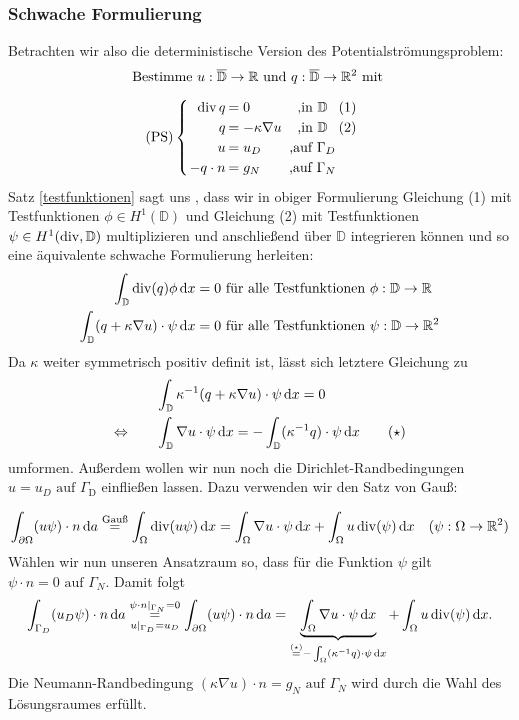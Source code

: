 \subsubsection{Schwache Formulierung}
Betrachten wir also die deterministische Version des Potentialströmungsproblem:
\[ \text{Bestimme } u:\overline{\mathbb{D}} \to \R \text{ und } q: \overline{\mathbb{D}} \to \R^2 \text{ mit } \newline \]
\[\setlength\arraycolsep{1pt}
\text{(PS)}\begin{cases} 
\begin{array}{rlcr}
\dive q     &= 0                 &\text{ ,} \text{in } \mathbb{D} &(1)\\
q           &= - \kappa \nabla u &\text{ ,} \text{in }\mathbb{D} &(2)\\
u           &= u_D               &\text{ ,} \text{auf } \Gamma_D \\
-q \cdot n  &= g_N               &\text{ ,} \text{auf } \Gamma_N 
\end{array}
\end{cases} 
\]
Satz \ref{testfunktionen} sagt uns , dass wir in obiger Formulierung Gleichung (1) mit Testfunktionen $\phi \in H^1(\mathbb{D})$ und Gleichung (2) mit Testfunktionen $\psi \in H^1(\operatorname{div},\mathbb{D})$ multiplizieren und anschließend über $\mathbb{D}$ integrieren können und so eine äquivalente schwache Formulierung herleiten:
\begin{align*}
	\int_{\mathbb{D}} \operatorname{div}(q) \phi \, \mathrm{d} x &= 0 \text{ für alle Testfunktionen } \phi : \mathbb{D} \to \mathbb{R} \\
	\int_{\mathbb{D}} (q + \kappa \nabla u) \cdot \psi \, \mathrm{d} x &= 0 \text{ für alle Testfunktionen } \psi : \mathbb{D} \to \mathbb{R}^2
\end{align*}
Da $\kappa$ weiter symmetrisch positiv definit ist, lässt sich letztere Gleichung zu 
\begin{align*}
	&\int_{\mathbb{D}} \kappa^{-1} (q + \kappa \nabla u) \cdot \psi \, \mathrm{d} x = 0 \\
	\Leftrightarrow \qquad &\int_{\mathbb{D}} \nabla u \cdot \psi \, \mathrm{d} x = - \int_{\mathbb{D}} (\kappa^{-1}q)\cdot \psi \, \mathrm{d} x \qquad (\star) 
\end{align*}
umformen. Außerdem wollen wir nun noch die Dirichlet-Randbedingungen $u = u_D \text{ auf } \Gamma_{\text{D}}$ einfließen lassen. Dazu verwenden wir den Satz von Gauß:


\[ \int_{\partial\Omega} (u\psi) \cdot n \, \mathrm{d} a \stackrel{\text{Gauß}}{=} 
 \int_{\Omega} \operatorname{div}(u\psi) \, \mathrm{d} x = \int_{\Omega} \nabla u \cdot \psi \, \mathrm{d} x + \int_{\Omega} u \operatorname{div}(\psi) \, \mathrm{d} x \quad (\psi:\Omega \to \mathbb{R}^2) \]
Wählen wir nun unseren Ansatzraum so, dass  für die Funktion $ \psi$ gilt $ \psi \cdot n = 0 \text{ auf } \Gamma_N $. Damit folgt
\begin{align*}
\int_{\Gamma_D} (u_D\psi) \cdot n \, \mathrm{d} a \overset{\psi \cdot n|_{\Gamma_N} = 0}{\underset{u |_{\Gamma_D} = u_D} {=}} \int_{\partial\Omega} (u\psi) \cdot n \, \mathrm{d} a = \underbrace{\int_{\Omega} \nabla u \cdot \psi \, \mathrm{d} x}_{\stackrel{(\star)}{=}- \int_{\Omega} (\kappa^{-1} q) \cdot \psi \, \mathrm{d} x } + \int_{\Omega} u \operatorname{div}(\psi) \, \mathrm{d} x.
\end{align*}
Die Neumann-Randbedingung $ (\kappa\nabla u) \cdot n = g_N \text{ auf } \Gamma_N $ wird durch die Wahl des Lösungsraumes erfüllt.



